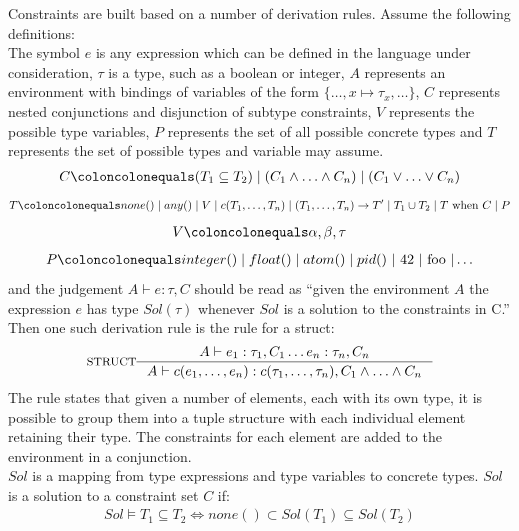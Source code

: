 \documentclass[12pt, titlepage]{article}
\begin{document}
\indent Constraints are built based on a number of derivation rules. Assume the following definitions: \\
\indent The symbol $e$ is any expression which can be defined in the language under consideration, $\tau$ is a type, such as a boolean or integer, $A$ represents an environment with bindings of variables of the form $\{\ldots, x \mapsto \tau_x, \ldots\}$, $C$ represents nested conjunctions and disjunction of subtype constraints, $V$ represents the possible type variables, $P$ represents the set of all possible concrete types and $T$ represents the set of possible types and variable may assume.
\begin{align*} 
	C \coloncolonequals (T_1 \subseteq T_2) \mid (C_1 \land \ldots \land C_n) \mid (C_1 \lor \ldots \lor C_n)
\end{align*}
\begin{align*} 
	T \coloncolonequals none() \mid any() \mid V \mid c(T_1, \ldots, T_n) \mid (T_1, \ldots, T_n) \rightarrow T'\mid T_1 \cup T_2 \mid T \text{ when } C \mid P
\end{align*}
\begin{align*} 
	V \coloncolonequals \alpha, \beta, \tau
\end{align*}
\begin{align*} 
	P \coloncolonequals integer() \mid float() \mid atom() \mid pid()\text{ } | \text{ 42 } | \text{ foo } | \ldots
\end{align*}
and the judgement $A \vdash e : \tau, C$ should be read as ``given the environment $A$ the expression $e$ has type $Sol(\tau)$ whenever $Sol$ is a solution to the constraints in C.'' \\
Then one such derivation rule is the rule for a struct:
                \[
\inference*[STRUCT]{  A \vdash  e_1 : \tau_1, C_1 \ldots e_n : \tau_n, C_n}
                                        {A \vdash  c(e_1, \ldots, e_n) : c(\tau_1, \ldots, \tau_n), C_1 \land \ldots \land C_n}
                \]
The rule states that given a number of elements, each with its own type, it is possible to group them into a tuple structure with each individual element retaining their type. The constraints for each element are added to the environment in a conjunction. \\
$Sol$ is a mapping from type expressions and type variables to concrete types. $Sol$ is a solution to a constraint set $C$ if:
\begin{align*} 
	Sol \models T_1 \subseteq T_2 \iff none() \subset Sol(T_1) \subseteq Sol(T_2)
\end{align*}
\end{document}
